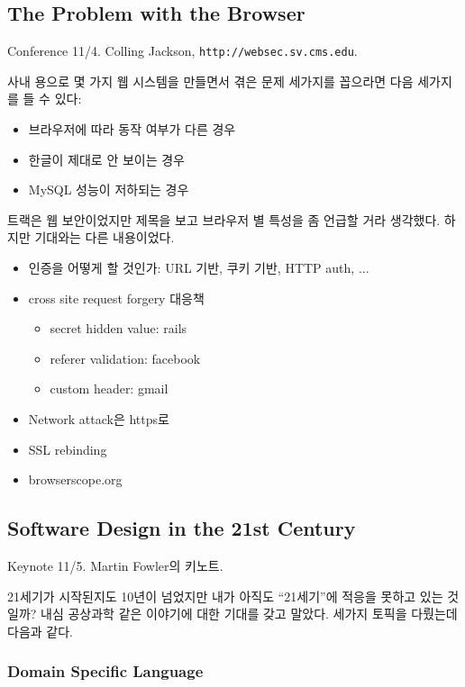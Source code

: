 \documentclass[11pt]{article}
\begin{document}
\subsection{The Problem with the Browser}

Conference 11/4. Colling Jackson, \texttt{http://websec.sv.cms.edu}.
 
사내 용으로 몇 가지 웹 시스템을 만들면서 겪은 문제 세가지를 꼽으라면 다음 
세가지를 들 수 있다:
\begin{itemize}
\item 브라우저에 따라 동작 여부가 다른 경우
\item 한글이 제대로 안 보이는 경우
\item MySQL 성능이 저하되는 경우
\end{itemize}
 
트랙은 웹 보안이었지만 제목을 보고 브라우저 별 특성을 좀 언급할 거라 생각했다.
하지만 기대와는 다른 내용이었다.
 
\begin{itemize}
\item 인증을 어떻게 할 것인가: URL 기반, 쿠키 기반, HTTP auth, ...
\item cross site request forgery 대응책
    \begin{itemize}
    \item secret hidden value: rails
    \item referer validation: facebook
    \item custom header: gmail
    \end{itemize}
\item Network  attack은 https로 
\item SSL rebinding
\item browserscope.org 
\end{itemize}
 
\subsection{Software Design in the 21st Century}

Keynote 11/5. Martin Fowler의 키노트.
 
21세기가 시작된지도 10년이 넘었지만 내가 아직도 ``21세기''에 적응을 못하고 
있는 것일까? 내심 공상과학 같은 이야기에 대한 기대를 갖고 말았다.
세가지 토픽을 다뤘는데 다음과 같다.
 
\subsubsection{Domain Specific Language}
 
\end{document}
